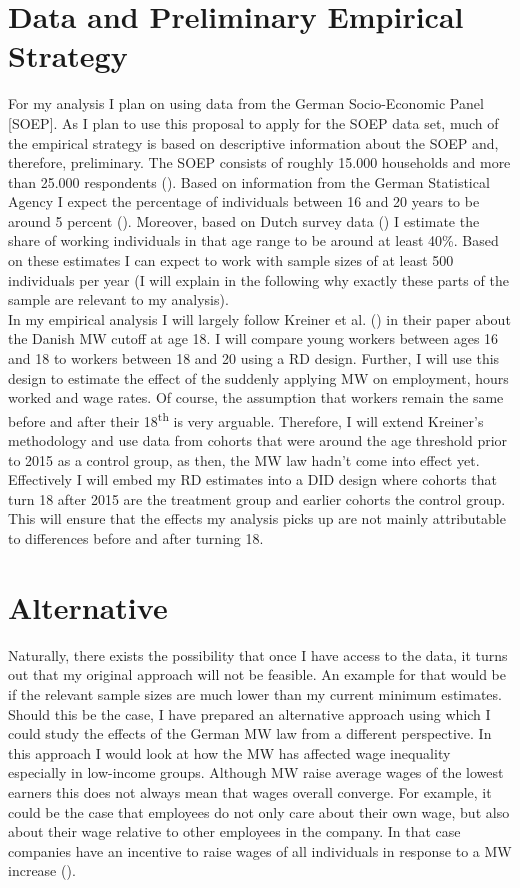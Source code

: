 \documentclass[11pt]{scrartcl}
\begin{document}
\section{Data and Preliminary Empirical Strategy}
For my analysis I plan on using data from the German Socio-Economic Panel [SOEP]. As I plan to use this proposal to apply for the SOEP data set, much of the empirical strategy is based on descriptive information about the SOEP and, therefore, preliminary. The SOEP consists of roughly 15.000 households and more than 25.000 respondents (\cite{DIWWebsite}). Based on information from the German Statistical Agency I expect the percentage of individuals between 16 and 20 years to be around 5 percent (\cite{StatistaWebsite}). Moreover, based on Dutch survey data (\cite{LISSWebsite}) I estimate the share of working individuals in that age range to be around at least 40\%. Based on these estimates I can expect to work with sample sizes of at least 500 individuals per year (I will explain in the following why exactly these parts of the sample are relevant to my analysis). \\

In my empirical analysis I will largely follow Kreiner et al. (\citeyear{KreinerReckMW2020}) in their paper about the Danish MW cutoff at age 18. I will compare young workers between ages 16 and 18 to workers between 18 and 20 using a RD design. Further, I will use this design to estimate the effect of the suddenly applying MW on employment, hours worked and wage rates. Of course, the assumption that workers remain the same before and after their 18\textsuperscript{th} is very arguable. Therefore, I will extend Kreiner's methodology and use data from cohorts that were around the age threshold prior to 2015 as a control group, as then, the MW law hadn't come into effect yet. Effectively I will embed my RD estimates into a DID design where cohorts that turn 18 after 2015 are the treatment group and earlier cohorts the control group. This will ensure that the effects my analysis picks up are not mainly attributable to differences before and after turning 18.
\section{Alternative}
Naturally, there exists the possibility that once I have access to the data, it turns out that my original approach will not be feasible. An example for that would be if the relevant sample sizes are much lower than my current minimum estimates. Should this be the case, I have prepared an alternative approach using which I could study the effects of the German MW law from a different perspective. In this approach I would look at how the MW has affected wage inequality especially in low-income groups. Although MW raise average wages of the lowest earners this does not always mean that wages overall converge. For example, it could be the case that employees do not only care about their own wage, but also about their wage relative to other employees in the company. In that case companies have an incentive to raise wages of all individuals in response to a MW increase (\cite{CardKruegerMWBook2015}).

\printbibliography
\end{document}
